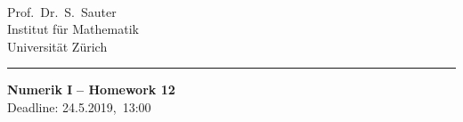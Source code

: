 \documentclass[11pt,a4paper,english,hyperref]{article}
\newcommand\blattNummer{12}
\newcommand\abgabeDatum{24.5.2019}
\theoremstyle{break}   %
\theoremstyle{definition}
\begin{document}
\parbox{0ex}{    }   \\
\parbox{25ex}{
  Prof.~Dr.~S.~Sauter\\
  Institut für Mathematik\\
  Universität Zürich
}
% 
\rule[0cm]{0.cm}{.01cm}                  
\hfill  \parbox{0.6\textwidth}{
  {\sf\LARGE\bfseries Numerik I}
  {\sf\Large\bfseries \;\;--\;\; Homework \blattNummer }\\[1.5ex]
  Deadline: \abgabeDatum,\ 13:00
}
\vspace{5ex}
\end{document}
